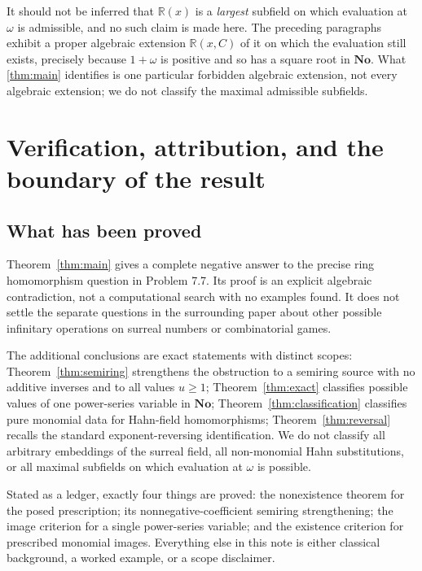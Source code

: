 \documentclass[11pt,letterpaper]{article}
\theoremstyle{definition}
\theoremstyle{remark}
\newcommand{\No}{\mathbf{No}}
\newcommand{\R}{\mathbb R}
\begin{document}
It should not be inferred that $\R(x)$ is a \emph{largest} subfield on which
evaluation at $\omega$ is admissible, and no such claim is made here. The
preceding paragraphs exhibit a proper algebraic extension $\R(x,C)$ of it on
which the evaluation still exists, precisely because $1+\omega$ is positive
and so has a square root in $\No$. What \cref{thm:main} identifies is one
particular forbidden algebraic extension, not every algebraic extension; we do
not classify the maximal admissible subfields.

\section{Verification, attribution, and the boundary of the result}\label{sec:audit}

\subsection{What has been proved}
Theorem~\ref{thm:main} gives a complete negative answer to the precise ring
homomorphism question in Problem 7.7. Its proof is an explicit algebraic
contradiction, not a computational search with no examples found. It does not
settle the separate questions in the surrounding paper about other possible
infinitary operations on surreal numbers or combinatorial games.

The additional conclusions are exact statements with distinct scopes:
Theorem~\ref{thm:semiring} strengthens the obstruction to a semiring source
with no additive inverses and to all values $u\ge1$;
Theorem~\ref{thm:exact} classifies possible values of one power-series variable
in $\No$; Theorem~\ref{thm:classification} classifies pure monomial data for
Hahn-field homomorphisms; Theorem~\ref{thm:reversal} recalls the standard
exponent-reversing identification. We do not classify all arbitrary embeddings
of the surreal field, all non-monomial Hahn substitutions, or all maximal
subfields on which evaluation at $\omega$ is possible.

Stated as a ledger, exactly four things are proved: the nonexistence theorem
for the posed prescription; its nonnegative-coefficient semiring
strengthening; the image criterion for a single power-series variable; and the
existence criterion for prescribed monomial images. Everything else in this
note is either classical background, a worked example, or a scope
disclaimer.
\end{document}
